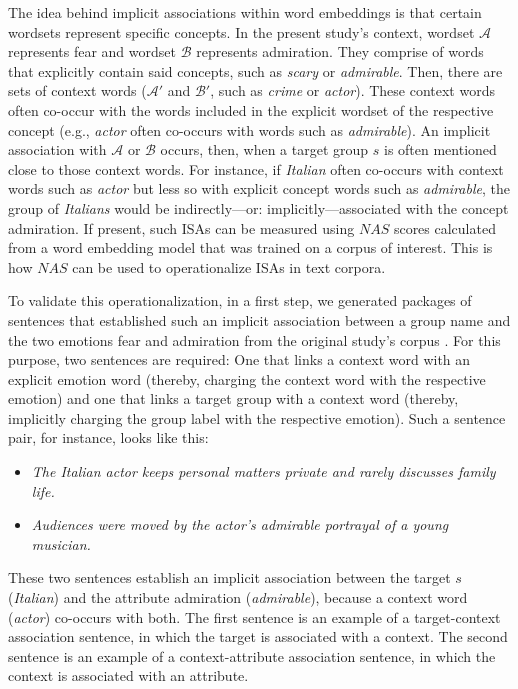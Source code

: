 The idea behind implicit associations within word embeddings is that certain wordsets represent specific concepts. In the present study's context, wordset $\mathcal{A}$ represents fear and wordset $\mathcal{B}$ represents admiration. They comprise of words that explicitly contain said concepts, such as \textit{scary} or \textit{admirable}. Then, there are sets of context words ($\mathcal{A'}$ and $\mathcal{B'}$, such as \textit{crime} or \textit{actor}). These context words often co-occur with the words included in the explicit wordset of the respective concept (e.g., \textit{actor} often co-occurs with words such as \textit{admirable}). An implicit association with $\mathcal{A}$ or $\mathcal{B}$ occurs, then, when a target group $s$ is often mentioned close to those context words. For instance, if \textit{Italian} often co-occurs with context words such as \textit{actor} but less so with explicit concept words such as \textit{admirable}, the group of \textit{Italians} would be indirectly---or: implicitly---associated with the concept admiration. If present, such ISAs can be measured using $NAS$ scores calculated from a word embedding model that was trained on a corpus of interest. This is how $NAS$ can be used to operationalize ISAs in text corpora.

To validate this operationalization, in a first step, we generated packages of sentences that established such an implicit association between a group name and the two emotions fear and admiration from the original study's corpus \parencite{mueller:2023:DRN}. For this purpose, two sentences are required: One that links a context word with an explicit emotion word (thereby, charging the context word with the respective emotion) and one that links a target group with a context word (thereby, implicitly charging the group label with the respective emotion). Such a sentence pair, for instance, looks like this: 

\begin{itemize}
    \item \textit{The Italian actor keeps personal matters private and rarely discusses family life.}
    \item \textit{Audiences were moved by the actor’s admirable portrayal of a young musician.}
\end{itemize}

These two sentences establish an implicit association between the target $s$ (\textit{Italian}) and the attribute admiration (\textit{admirable}), because a context word (\textit{actor}) co-occurs with both. The first sentence is an example of a target-context association sentence, in which the target is associated with a context. The second sentence is an example of a context-attribute association sentence, in which the context is associated with an attribute. 

